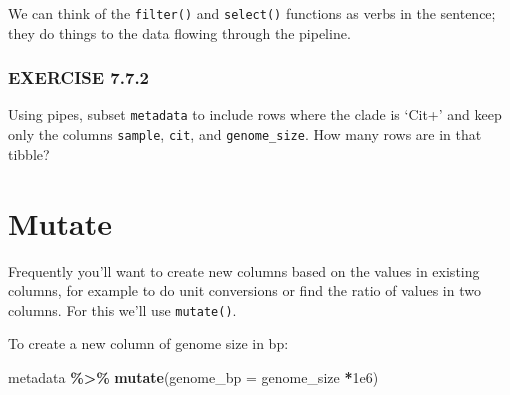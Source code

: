 \documentclass[
]{book}
\newenvironment{Shaded}{\begin{snugshade}}{\end{snugshade}}
\newcommand{\AttributeTok}[1]{\textcolor[rgb]{0.13,0.29,0.53}{#1}}
\newcommand{\FloatTok}[1]{\textcolor[rgb]{0.00,0.00,0.81}{#1}}
\newcommand{\FunctionTok}[1]{\textcolor[rgb]{0.13,0.29,0.53}{\textbf{#1}}}
\newcommand{\NormalTok}[1]{#1}
\newcommand{\SpecialCharTok}[1]{\textcolor[rgb]{0.81,0.36,0.00}{\textbf{#1}}}
\begin{document}
We can think of the \texttt{filter()} and \texttt{select()} functions as verbs in the sentence; they do things to the data flowing through the pipeline.

\subsubsection*{EXERCISE 7.7.2}\label{exercise-7.7.2}

Using pipes, subset \texttt{metadata} to include rows where the clade is `Cit+' and keep only the columns \texttt{sample}, \texttt{cit}, and \texttt{genome\_size}.
How many rows are in that tibble?

\section{Mutate}\label{mutate}

Frequently you'll want to create new columns based on the values in existing columns, for example to do unit conversions or find the ratio of values in two columns. For this we'll use \texttt{mutate()}.

To create a new column of genome size in bp:

\begin{Shaded}
\begin{Highlighting}[]
\NormalTok{metadata }\SpecialCharTok{\%\textgreater{}\%}
  \FunctionTok{mutate}\NormalTok{(}\AttributeTok{genome\_bp =}\NormalTok{ genome\_size }\SpecialCharTok{*}\FloatTok{1e6}\NormalTok{)}
\end{Highlighting}
\end{Shaded}
\end{document}

